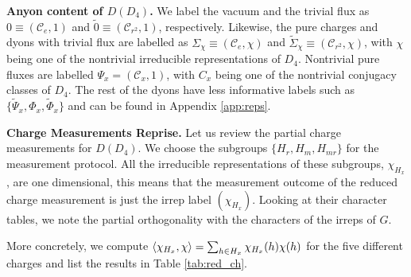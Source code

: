 \documentclass[two column]{article}
\newcommand{\jovan}[1]{\textcolor{blue}{[#1]}}
\begin{document}
\textbf{Anyon content of $D(D_4)$.} We label the vacuum and the trivial flux as $0 \equiv (\mathcal{C}_e, 1)$ and $\tilde 0 \equiv (\mathcal{C}_{r^2}, 1)$, respectively. Likewise, the pure charges and dyons with trivial flux are labelled as $\Sigma_{\chi} \equiv (\mathcal{C}_e, \chi)$ and $\tilde{\Sigma}_{\chi} \equiv (\mathcal{C}_{r^2}, \chi)$, with $\chi$ being one of the nontrivial irreducible representations of $D_4$.
Nontrivial pure fluxes are labelled $\Psi_x = (\mathcal{C}_x, 1)$, with $C_x$ being one of the nontrivial conjugacy classes of $D_4$. The rest of the dyons have less informative labels such as $\{\tilde{\Psi}_x, \Phi_x, \tilde{\Phi}_x\}$ and can be found in Appendix \ref{app:reps}.

\textbf{Charge Measurements Reprise.}
Let us review the partial charge measurements for $D(D_4)$.
We choose the subgroups $\{H_r, H_m, H_{mr}\}$ for the measurement protocol. All the irreducible representations of these subgroups, $\chi_{H_x}$, are one dimensional, this means that the measurement outcome of the reduced charge measurement is just the irrep label $(\chi_{H_x})$. Looking at their character tables, we note the partial orthogonality with the characters of the irreps of $G$. 



More concretely, we compute $ \braket{\chi_{H_x}, \chi} = \sum_{h\in H_x} \chi_{H_x}(h)\chi(h)$ for the five different charges and list the results in Table \ref{tab:red_ch}.
\end{document}
